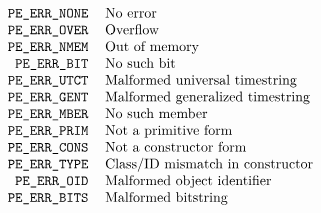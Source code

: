
\normalsize
\[\begin{tabular}{rl}
\tt PE\_ERR\_NONE&	No error\\
\tt PE\_ERR\_OVER&	Overflow\\
\tt PE\_ERR\_NMEM&	Out of memory\\
\tt PE\_ERR\_BIT&	No such bit\\
\tt PE\_ERR\_UTCT&	Malformed universal timestring\\
\tt PE\_ERR\_GENT&	Malformed generalized timestring\\
\tt PE\_ERR\_MBER&	No such member\\
\tt PE\_ERR\_PRIM&	Not a primitive form\\
\tt PE\_ERR\_CONS&	Not a constructor form\\
\tt PE\_ERR\_TYPE&	Class/ID mismatch in constructor\\
\tt PE\_ERR\_OID&	Malformed object identifier\\
\tt PE\_ERR\_BITS&	Malformed bitstring
\end{tabular}\]
